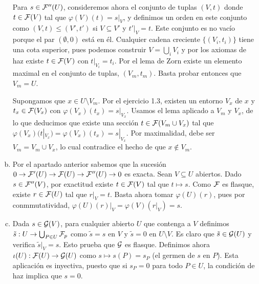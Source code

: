 \documentclass[twoside]{article}
\begin{document}
\begin{solucion}
\begin{enumerate}[(a)]
Para $s\in\mathcal{F}''(U)$, consideremos ahora el conjunto de tuplas $(V,t)$ donde $t\in\mathcal{F}(V)$ tal que $\varphi(V)(t)=s|_V$, y definimos un orden en este conjunto como $(V,t)\leq (V',t')$ si $V\subseteq V'$ y $t'|_V=t$. Este conjunto es no vacío porque el par $(\emptyset, 0)$ está en él. Cualquier cadena creciente $\{(V_i,t_i)\}$ tiene una cota superior, pues podemos construir $V=\bigcup_i V_i$ y por los axiomas de haz existe $t\in\mathcal{F}(V)$ con $t|_{V_i}=t_i$. Por el lema de Zorn existe un elemento maximal en el conjunto de tuplas, $(V_m,t_m)$. Basta probar entonces que $V_m=U$. 

Supongamos que $x\in U\setminus V_m$. Por el ejercicio 1.3, existen un entorno $V_x$ de $x$ y $t_x\in\mathcal{F}(V_x)$ con $\varphi(V_x)(t_x)=s|_{V_x}$. Usamos el lema aplicado a $V_m$ y $V_x$, de lo que deducimos que existe una sección $t\in\mathcal{F}(V_m\cup V_x)$ tal que $\varphi(V_x)(t|_{V_x})=\varphi(V_x)(t_x)=s|_{V_x}$. Por maximalidad, debe ser $V_m=V_m\cup V_x$, lo cual contradice el hecho de que $x\notin V_m$. 

\item Por el apartado anterior sabemos que la sucesión $0\to\mathcal{F}'(U)\to\mathcal{F}(U)\to\mathcal{F}''(U)\to 0$ es exacta. Sean $V\subseteq U$ abiertos. Dado $s\in\mathcal{F}''(V)$, por exactitud existe $t\in\mathcal{F}(V)$ tal que $t\mapsto s$. Como $\mathcal{F}$ es flasque, existe $r\in\mathcal{F}(U)$ tal que $r|_V=t$. Basta ahora tomar $\varphi(U)(r)$, pues por conmmutatividad, $\varphi(U)(r)|_V=\varphi(V)(r|_V)=s$. 

\item Dada $s\in\mathcal{G}(V)$, para cualquier abierto $U$ que contenga a $V$ definimos $\tilde{s}:U\to \bigcup_{P\in U}\mathcal{F}_p$ como $\tilde{s}=s$ en $V$ y $\tilde{s}=0$ en $U\setminus V$. Es claro que $\tilde{s}\in\mathcal{G}(U)$ y verifica $\tilde{s}|_V=s$. Esto prueba que $\mathcal{G}$ es flasque. Definimos ahora $\iota(U):\mathcal{F}(U)\to\mathcal{G}(U)$ como $s\mapsto s(P)=s_P$ (el germen de $s$ en $P$). Esta aplicación es inyectiva, puesto que si $s_P=0$ para todo $P\in U$, la condición de haz implica que $s=0$. 
\end{enumerate}

\end{solucion}
%
%
%
%
%
%
%
%
%
%
%
%
%
%
%
%
%
%
%
%
%
%
\end{document}
